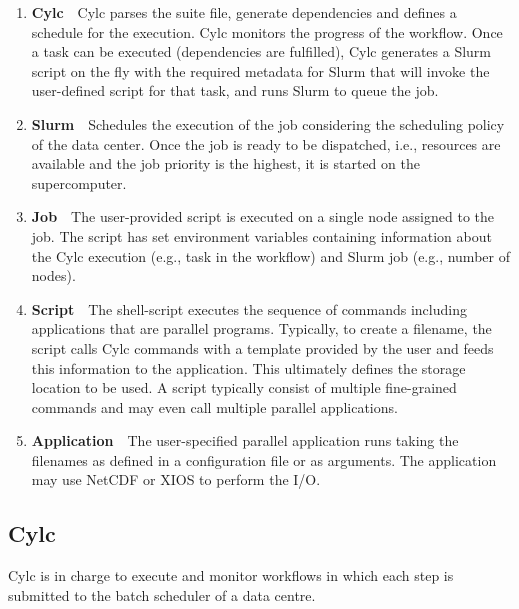 \documentclass[a4paper]{article}
\begin{document}
\begin{enumerate}
  \item \textbf{Cylc}\ \ Cylc parses the suite file, generate dependencies and defines a schedule for the execution.
  Cylc monitors the progress of the workflow.
  Once a task can be executed (dependencies are fulfilled), Cylc generates a Slurm script on the fly with the required metadata for Slurm that will invoke the user-defined script for that task, and runs Slurm to queue the job.

  \item \textbf{Slurm}\ \ Schedules the execution of the job considering the scheduling policy of the data center.
  Once the job is ready to be dispatched, i.e., resources are available and the job priority is the highest, it is started on the supercomputer.

  \item \textbf{Job}\ \ The user-provided script is executed on a single node assigned to the job.
  The script has set environment variables containing information about the Cylc execution (e.g., task in the workflow) and Slurm job (e.g., number of nodes).

  \item \textbf{Script}\ \ The shell-script executes the sequence of commands including applications that are parallel programs.
  Typically, to create a filename, the script calls Cylc commands with a template provided by the user and feeds this information to the application.
  This ultimately defines the storage location to be used.
  A script typically consist of multiple fine-grained commands and may even call multiple parallel applications.

  \item \textbf{Application}\ \ The user-specified parallel application runs taking the filenames as defined in a configuration file or as arguments.
  The application may use NetCDF or XIOS to perform the I/O.
\end{enumerate}


\subsection{Cylc}

Cylc is in charge to execute and monitor workflows in which each step is submitted to the batch scheduler of a data centre.
\end{document}
